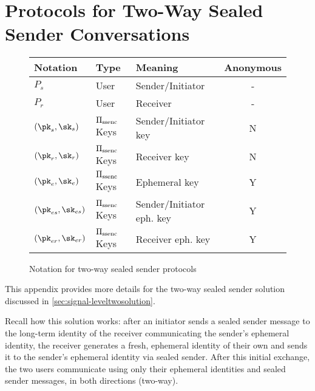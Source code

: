 \chapter{Protocols for Two-Way Sealed Sender Conversations}
\label{sec:signal-leveltwodetails}

\begin{figure}[ht]
  \centering
  \scriptsize
  \begin{tabular}{l|l|l|c}
  \toprule
  {\bf Notation} & {\bf Type} & {\bf Meaning} & {\bf Anonymous} \\
  \midrule
  $P_s$ & User & Sender/Initiator & - \\
  $P_r$ & User & Receiver & - \\
  $(\pk_s, \sk_s)$  & $\Pi_{\text{ssenc}}$ Keys & Sender/Initiator key & N \\
    $(\pk_r, \sk_r)$  & $\Pi_{\text{ssenc}}$ Keys & Receiver key & N \\
    $(\pk_{e}, \sk_{e})$  & $\Pi_{\text{ssenc}}$ Keys & Ephemeral key & Y \\
  $(\pk_{es}, \sk_{es})$  & $\Pi_{\text{ssenc}}$ Keys & Sender/Initiator eph. key & Y\\
  $(\pk_{er}, \sk_{er})$  & $\Pi_{\text{ssenc}}$ Keys & Receiver eph. key & Y \\
  \end{tabular}
  \caption{Notation for two-way sealed sender protocols}
\end{figure}

This appendix provides more details for the two-way sealed sender solution discussed in \cref{sec:signal-leveltwosolution}.


Recall how this solution works: after an
initiator sends a sealed sender message to the long-term identity of the
receiver communicating the sender's ephemeral identity, the receiver
generates a fresh, ephemeral identity of their own and sends it to the
sender's ephemeral identity via sealed sender.  After this initial
exchange, the two users communicate using only their ephemeral
identities and sealed sender messages, in both directions (two-way).

